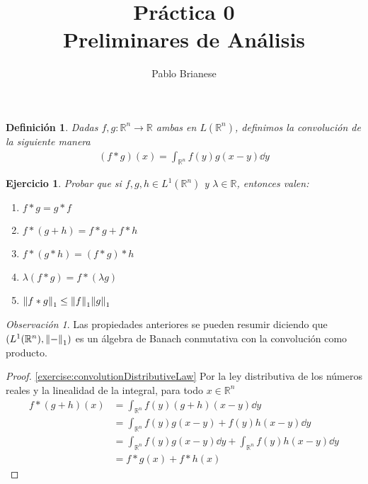 \documentclass{article}
\title{Práctica 0 \\ Preliminares de Análisis}
\author{Pablo Brianese}
\newcommand{\placeholderParameter}{-}
\newcommand{\realNumbers}{\mathbb{R}}
\newtheorem{definition}{Definición}
\newtheorem{exercise}{Ejercicio}
\theoremstyle{remark}
\newtheorem{remark}{Observación}
\begin{document}
\maketitle
  \begin{definition}
    Dadas \(f, g : \realNumbers^n \rightarrow \realNumbers\) ambas en \(L(\realNumbers^n)\), definimos la convolución de la siguiente manera
    \begin{align}
      (f * g) (x)
      =
      \int_{\realNumbers^n} f(y) g(x - y) \dd y
    \end{align}
  \end{definition}

  \begin{exercise}
    Probar que si \(f, g, h \in L^1(\realNumbers^n)\) y \(\lambda \in \realNumbers\), entonces valen:
    \begin{enumerate}
      \item 
        \label{exercise:convolutionConmutativity}
        \(f * g = g * f\)
      \item
        \label{exercise:convolutionDistributiveLaw}
        \(f * (g + h) = f * g + f * h\)
      \item 
        \label{exercise:convolutionAsociativity}
        \(f * (g * h) = (f * g) * h\)
      \item 
        \label{exercise:convolutionScalarAsociativity}
        \(\lambda (f * g) = f * (\lambda g)\)
      \item
        \label{exercise:convolutionL1Bound}
        \(\norm{f * g}_1 \leq \norm{f}_1 \norm{g}_1\)
    \end{enumerate}
  \end{exercise}

  \begin{remark}
    Las propiedades anteriores se pueden resumir diciendo que \((L^1(\realNumbers^n), \norm{\placeholderParameter}_1)\) es un álgebra de Banach conmutativa con la convolución como producto.
  \end{remark}

  \begin{proof}
    \ref{exercise:convolutionDistributiveLaw}
    Por la ley distributiva de los números reales y la linealidad de la integral, para todo \(x \in \realNumbers^n\)
    \begin{align}
      f * (g + h) (x)
      &=
      \int_{\realNumbers^n} f(y) (g + h) (x - y) \dd y
      \\
      &=
      \int_{\realNumbers^n} f(y) g(x - y) + f(y) h(x - y)  \dd y
      \\
      &=
      \int_{\realNumbers^n} f(y) g(x - y) \dd y + \int_{\realNumbers^n} f(y) h(x - y)  \dd y
      \\
      &=
      f * g (x) + f * h (x)
    \end{align}
  \end{proof} 
\end{document}
